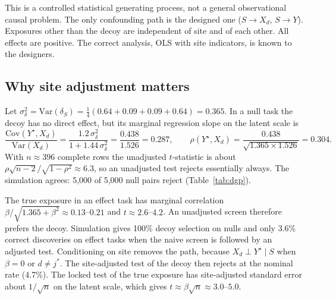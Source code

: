 This is a controlled statistical generating process, not a general
observational causal problem. The only confounding path is the designed one
($S\to X_d$, $S\to Y$). Exposures other than the decoy are independent of
site and of each other. All effects are positive. The correct analysis,
OLS with site indicators, is known to the designers.

\subsection{Why site adjustment matters}
\label{app:dgp-ovb}
Let $\sigma_\delta^2=\mathrm{Var}(\delta_S)=\tfrac14(0.64+0.09+0.09+0.64)=0.365$.
In a null task the decoy has no direct effect, but its marginal regression
slope on the latent scale is
\begin{equation}
\frac{\mathrm{Cov}(Y^\star,X_d)}{\mathrm{Var}(X_d)}=\frac{1.2\,\sigma_\delta^2}{1+1.44\,\sigma_\delta^2}=\frac{0.438}{1.526}=0.287,
\qquad
\rho(Y^\star,X_d)=\frac{0.438}{\sqrt{1.365\times1.526}}=0.304 .
\end{equation}
With $n\approx 396$ complete rows the unadjusted $t$-statistic is about
$\rho\sqrt{n-2}/\sqrt{1-\rho^2}\approx 6.3$, so an unadjusted test rejects
essentially always. The simulation agrees: 5,000 of 5,000 null pairs reject
(Table~\ref{tab:dgp}).

The true exposure in an effect task has marginal correlation
$\beta/\sqrt{1.365+\beta^2}\approx0.13$--$0.21$ and $t\approx 2.6$--$4.2$.
An unadjusted screen therefore prefers the decoy. Simulation gives 100\% decoy
selection on nulls and only 3.6\% correct discoveries on effect tasks when the
naive screen is followed by an adjusted test. Conditioning on site removes the
path, because $X_d\perp Y^\star\mid S$ when $\beta=0$ or $d\neq j^*$. The
site-adjusted test of the decoy then rejects at the nominal rate (4.7\%). The
locked test of the true exposure has site-adjusted standard error about
$1/\sqrt{n}$ on the latent scale, which gives $t\approx\beta\sqrt{n}\approx
3.0$--$5.0$.

